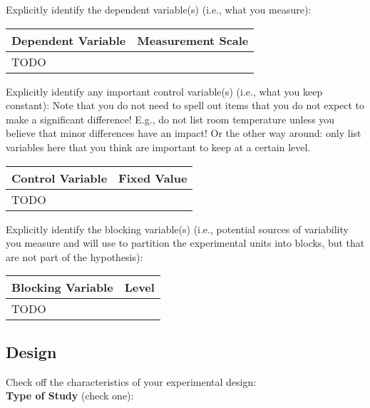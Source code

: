 \documentclass{article}
\begin{document}
Explicitly identify the dependent variable(s) (i.e., what you measure):\\

\begin{table}[h!]
\centering
\begin{tabular}{|l|l|}
\hline
\rowcolor{black}
\color{white}Dependent Variable & \color{white}Measurement Scale \\
\hline
TODO &  \\
\hline
\end{tabular}
\end{table}
Explicitly identify any important control variable(s) (i.e., what you keep constant): Note that you do not need to spell out items that you do not expect to make a significant difference! E.g., do not list room temperature unless you believe that minor differences have an impact! Or the other way around: only list variables here that you think are important to keep at a certain level.
\begin{table}[h!]
\centering
\begin{tabular}{|l|l|}
\hline
\rowcolor{black}
\color{white}Control Variable & \color{white}Fixed Value \\
\hline
TODO &  \\
\hline
\end{tabular}
\end{table}
Explicitly identify the blocking variable(s) (i.e., potential sources of variability you measure and will use to partition the experimental units into blocks, but that are not part of the hypothesis):
\begin{table}[h!]
\centering
\begin{tabular}{|l|l|}
\hline
\rowcolor{black}
\color{white}Blocking Variable & \color{white}Level \\
\hline
TODO &  \\
\hline
\end{tabular}
\end{table}

\subsection{Design}
Check off the characteristics of your experimental design:\\

\textbf{Type of Study} (check one):\\
\noindent
\begin{minipage}{0.4\textwidth}
\end{minipage}%
\begin{minipage}{0.4\textwidth}
\end{minipage}%
\begin{minipage}{0.2\textwidth}
\end{minipage}\\\\
\end{document}
